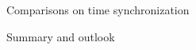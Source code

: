 \documentclass[compress, 13pt, aspectratio=169]{beamer}
\begin{document}
\begin{frame}[t]{Comparisons on time synchronization}

\end{frame}

\begin{frame}[t]{Summary and outlook}

\end{frame}
\end{document}
